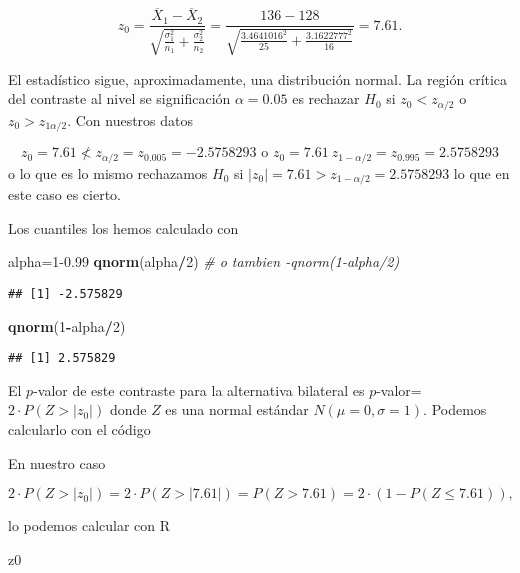 \documentclass[
]{article}
\newenvironment{Shaded}{\begin{snugshade}}{\end{snugshade}}
\newcommand{\CommentTok}[1]{\textcolor[rgb]{0.56,0.35,0.01}{\textit{#1}}}
\newcommand{\DecValTok}[1]{\textcolor[rgb]{0.00,0.00,0.81}{#1}}
\newcommand{\FloatTok}[1]{\textcolor[rgb]{0.00,0.00,0.81}{#1}}
\newcommand{\KeywordTok}[1]{\textcolor[rgb]{0.13,0.29,0.53}{\textbf{#1}}}
\newcommand{\NormalTok}[1]{#1}
\newcommand{\OperatorTok}[1]{\textcolor[rgb]{0.81,0.36,0.00}{\textbf{#1}}}
\begin{document}
\[z_0=\dfrac{\overline{X}_1-\overline{X}_2}{\sqrt{\frac{\sigma_1^2}{n_1}+\frac{\sigma_2^2}{n_2}}}=\frac{136-128}{\sqrt{\frac{3.4641016^2}{25}+\frac{3.1622777^2}{16}}}=7.61.\]

El estadístico sigue, aproximadamente, una distribución normal. La
región crítica del contraste al nivel se significación \(\alpha=0.05\)
es rechazar \(H_0\) si \(z_0<z_{\alpha/2}\) o \(z_0>z_{1\alpha/2}\). Con
nuestros datos

\[z_0=7.61\not< z_{\alpha/2}=z_{0.005}=-2.5758293 \mbox{ o } z_0=7.61  \> z_{1-\alpha/2}=
z_{0.995}=2.5758293\] o lo que es lo mismo rechazamos \(H_0\) si
\(|z_0|=7.61> z_{1-\alpha/2}=2.5758293\) lo que en este caso es cierto.

Los cuantiles los hemos calculado con

\begin{Shaded}
\begin{Highlighting}[]
\NormalTok{alpha=}\DecValTok{1}\FloatTok{{-}0.99}
\KeywordTok{qnorm}\NormalTok{(alpha}\OperatorTok{/}\DecValTok{2}\NormalTok{) }\CommentTok{\# o tambien {-}qnorm(1{-}alpha/2)}
\end{Highlighting}
\end{Shaded}

\begin{verbatim}
## [1] -2.575829
\end{verbatim}

\begin{Shaded}
\begin{Highlighting}[]
\KeywordTok{qnorm}\NormalTok{(}\DecValTok{1}\OperatorTok{{-}}\NormalTok{alpha}\OperatorTok{/}\DecValTok{2}\NormalTok{)}
\end{Highlighting}
\end{Shaded}

\begin{verbatim}
## [1] 2.575829
\end{verbatim}

El \(p\)-valor de este contraste para la alternativa bilateral es
\(p\)-valor=\(2\cdot P(Z>|z_0|)\) donde \(Z\) es una normal estándar
\(N(\mu=0,\sigma=1)\). Podemos calcularlo con el código

En nuestro caso

\[2\cdot P(Z>|z_0|)= 2\cdot P(Z>|7.61|)=P(Z>7.61)=2\cdot(1-P(Z\leq 7.61 )),\]

lo podemos calcular con R

\begin{Shaded}
\begin{Highlighting}[]
\NormalTok{z0}
\end{Highlighting}
\end{Shaded}
\end{document}
